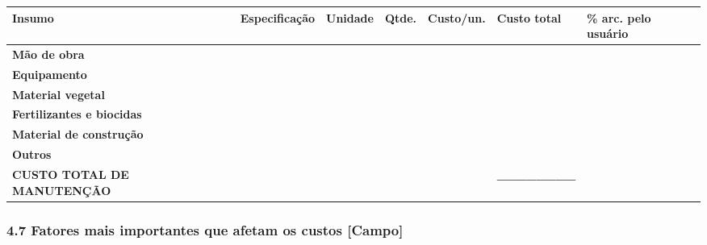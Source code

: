 {
\begin{longtable}[]{@{}
  >{\raggedright\arraybackslash}p{}
  >{\raggedright\arraybackslash}p{}
  >{\raggedright\arraybackslash}p{}
  >{\raggedleft\arraybackslash}p{}
  >{\raggedleft\arraybackslash}p{}
  >{\raggedleft\arraybackslash}p{}
  >{\centering\arraybackslash}p{}@{}}
\toprule\noalign{}
\begin{minipage}[b]{\linewidth}\raggedright
Insumo
\end{minipage} & \begin{minipage}[b]{\linewidth}\raggedright
Especificação
\end{minipage} & \begin{minipage}[b]{\linewidth}\raggedright
Unidade
\end{minipage} & \begin{minipage}[b]{\linewidth}\raggedleft
Qtde.
\end{minipage} & \begin{minipage}[b]{\linewidth}\raggedleft
Custo/un.
\end{minipage} & \begin{minipage}[b]{\linewidth}\raggedleft
Custo total
\end{minipage} & \begin{minipage}[b]{\linewidth}\centering
\% arc. pelo usuário
\end{minipage} \\
\midrule\noalign{}
\endhead
\bottomrule\noalign{}
\endlastfoot
\textbf{Mão de obra} & & & & & & \\
\textbf{Equipamento} & & & & & & \\
\textbf{Material vegetal} & & & & & & \\
\textbf{Fertilizantes e biocidas} & & & & & & \\
\textbf{Material de construção} & & & & & & \\
\textbf{Outros} & & & & & & \\
\textbf{CUSTO TOTAL DE MANUTENÇÃO} & & & & & \textbf{\_\_\_\_\_\_\_\_} & \\
\end{longtable}
}

\subsubsection{4.7 Fatores mais importantes que afetam os custos {[Campo]}}\label{fatores-mais-importantes-que-afetam-os-custos}

